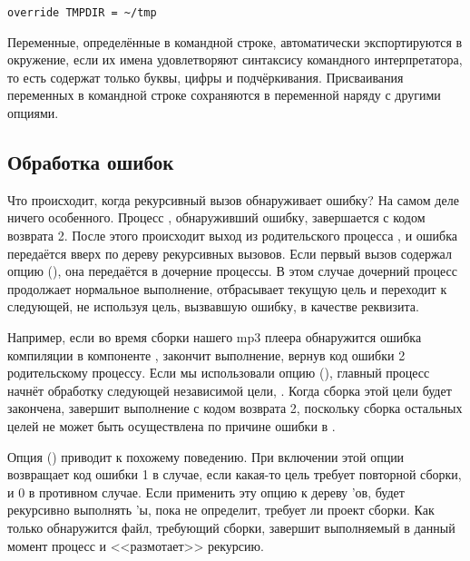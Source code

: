 {\footnotesize
\begin{verbatim}
override TMPDIR = ~/tmp
\end{verbatim}
}

Переменные, определённые в командной строке, автоматически
экспортируются в окружение, если их имена удовлетворяют синтаксису
командного интерпретатора, то есть содержат только буквы, цифры и
подчёркивания. Присваивания переменных в командной строке сохраняются
в переменной  наряду с другими опциями.

\subsection{Обработка ошибок}

Что происходит, когда рекурсивный вызов \GNUmake{} обнаруживает
ошибку? На самом деле ничего особенного. Процесс \GNUmake{},
обнаруживший ошибку, завершается с кодом возврата 2. После этого
происходит выход из родительского процесса \GNUmake{}, и ошибка
передаётся вверх по дереву рекурсивных вызовов. Если первый вызов
\GNUmake{} содержал опцию 
(), она передаётся в дочерние процессы. В этом случае
дочерний процесс \GNUmake{} продолжает нормальное выполнение,
отбрасывает текущую цель и переходит к следующей, не используя цель,
вызвавшую ошибку, в качестве реквизита.

Например, если во время сборки нашего mp3 плеера обнаружится ошибка
компиляции в компоненте , \GNUmake{} закончит
выполнение, вернув код ошибки 2 родительскому процессу. Если мы
использовали опцию  (),
главный процесс \GNUmake{} начнёт обработку следующей независимой
цели, . Когда сборка этой цели будет закончена,
\GNUmake{} завершит выполнение с кодом возврата 2, поскольку сборка
остальных целей не может быть осуществлена по причине ошибки в
.

Опция  () приводит к похожему
поведению. При включении этой опции \GNUmake{} возвращает код ошибки 1
в случае, если какая-то цель требует повторной сборки, и 0 в противном
случае. Если применить эту опцию к дереву \Makefile{}'ов, \GNUmake{}
будет рекурсивно выполнять \Makefile{}'ы, пока не определит, требует
ли проект сборки. Как только обнаружится файл, требующий сборки,
\GNUmake{} завершит выполняемый в данный момент процесс \GNUmake{} и
<<размотает>> рекурсию.

